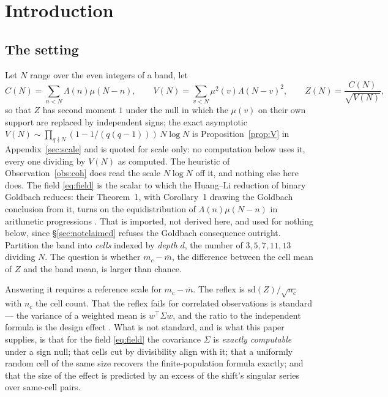\documentclass[11pt,a4paper]{article}
\theoremstyle{plain}
\theoremstyle{definition}
\theoremstyle{remark}
\begin{document}
\section{Introduction}

\subsection{The setting}

Let $N$ range over the even integers of a band, let
\begin{equation}\label{eq:field}
  C(N)=\sum_{n<N}\Lambda(n)\mu(N-n),
  \qquad
  V(N)=\sum_{v<N}\mu^2(v)\Lambda(N-v)^2,
  \qquad
  Z(N)=\frac{C(N)}{\sqrt{V(N)}},
\end{equation}
so that $Z$ has second moment $1$ under the null in which the $\mu(v)$
on their own support are replaced by independent signs; the exact
asymptotic $V(N)\sim\prod_{q\nmid N}(1-1/(q(q-1)))\,N\log N$ is
Proposition~\ref{prop:V} in Appendix~\ref{sec:scale} and is quoted for
scale only: no computation below uses it, every one dividing by $V(N)$
as computed. The heuristic of Observation~\ref{obs:coh} does read the
scale $N\log N$ off it, and nothing else here does. The field \eqref{eq:field} is the scalar to
which the Huang--Li reduction of binary Goldbach reduces: their
Theorem~1, with Corollary~1 drawing the Goldbach conclusion from it,
turns on the equidistribution of $\Lambda(n)\mu(N-n)$ in arithmetic
progressions \cite[Thm.~1, Cor.~1]{HL}. That is imported, not derived
here, and used for nothing below, since
\S\ref{sec:notclaimed} refuses the Goldbach consequence outright.
Partition the
band into \emph{cells} indexed by \emph{depth} $d$, the number of
$3,5,7,11,13$ dividing $N$. The question is whether
$m_c-\overline m$, the difference between the cell mean of $Z$ and the
band mean, is larger than chance.

Answering it requires a reference scale for $m_c-\overline m$. The
reflex is $\mathrm{sd}(Z)/\sqrt{n_c}$ with $n_c$ the cell count. That
the reflex fails for correlated observations is standard --- the
variance of a weighted mean is $w^{\top}\Sigma w$, and the ratio to
the independent formula is the design effect \cite{Kish}. What is not
standard, and is what this paper supplies, is that for the field
\eqref{eq:field} the covariance $\Sigma$ is \emph{exactly computable}
under a sign null; that cells cut by divisibility align with it; that
a uniformly random cell of the same size recovers the
finite-population formula exactly; and that the size of the effect is
predicted by an excess of the shift's singular series over same-cell
pairs.
\end{document}
